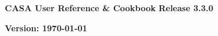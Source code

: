 \pagestyle{empty}

\begin{center}
\Huge
{\bf CASA User Reference \& Cookbook} 
\break 
\break 
\huge
{\bf Release 3.3.0}
\break 
\end{center}
\normalsize
\vspace{2.5cm}
\begin{figure}[h!]
\begin{center}
\end{center}
\end{figure}


\Large
\vfill
\begin{center}
{\bf Version: \today}
\end{center}
\normalsize

\pagebreak
